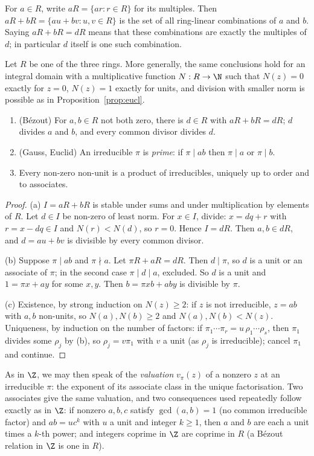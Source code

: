 For $a\in R$, write $aR=\{ar:r\in R\}$ for its multiples. Then
$aR+bR=\{au+bv:u,v\in R\}$ is the set of all ring-linear combinations of $a$ and $b$. Saying $aR+bR=dR$ means that these combinations are exactly the multiples of $d$; in particular $d$ itself is one such combination.

\begin{theorem}\label{thm:ufd}
Let $R$ be one of the three rings. More generally, the same conclusions
hold for an integral domain with a multiplicative function $N:R\to\N$
such that $N(z)=0$ exactly for $z=0$, $N(z)=1$ exactly for units,
and division with smaller norm is possible as in
Proposition~\ref{prop:eucl}.
\begin{enumerate}[label=(\alph*)]
\item (B\'ezout) For $a,b\in R$ not both zero, there is $d\in R$ with $aR+bR=dR$; $d$ divides $a$ and $b$, and every common divisor divides $d$.
\item (Gauss, Euclid) An irreducible $\pi$ is \emph{prime}: if $\pi\mid ab$ then $\pi\mid a$ or $\pi\mid b$.
\item Every non-zero non-unit is a product of irreducibles, uniquely up to order and to associates.
\end{enumerate}
\end{theorem}
\begin{proof}
(a) $I=aR+bR$ is stable under sums and under multiplication by elements of $R$. Let $d\in I$ be non-zero of least norm. For $x\in I$, divide: $x=dq+r$ with $r=x-dq\in I$ and $N(r)<N(d)$, so $r=0$. Hence $I=dR$. Then $a,b\in dR$, and $d=au+bv$ is divisible by every common divisor.

(b) Suppose $\pi\mid ab$ and $\pi\nmid a$. Let $\pi R+aR=dR$. Then $d\mid\pi$, so $d$ is a unit or an associate of $\pi$; in the second case $\pi\mid d\mid a$, excluded. So $d$ is a unit and $1=\pi x+ay$ for some $x,y$. Then $b=\pi xb+aby$ is divisible by $\pi$.

(c) Existence, by strong induction on $N(z)\ge2$: if $z$ is not irreducible, $z=ab$ with $a,b$ non-units, so $N(a),N(b)\ge2$ and $N(a),N(b)<N(z)$. Uniqueness, by induction on the number of factors: if $\pi_1\cdots\pi_r=u\,\rho_1\cdots\rho_s$, then $\pi_1$ divides some $\rho_j$ by (b), so $\rho_j=v\pi_1$ with $v$ a unit (as $\rho_j$ is irreducible); cancel $\pi_1$ and continue.
\end{proof}

As in $\Z$, we may then speak of the \emph{valuation} $v_\pi(z)$ of a nonzero $z$ at an irreducible $\pi$: the exponent of its associate class in the unique factorisation. Two associates give the same valuation, and two consequences used repeatedly follow exactly as in $\Z$: if nonzero $a,b,c$ satisfy $\gcd(a,b)=1$ (no common irreducible factor) and $ab=uc^k$ with $u$ a unit and integer $k\ge1$, then $a$ and $b$ are each a unit times a $k$-th power; and integers coprime in $\Z$ are coprime in $R$ (a B\'ezout relation in $\Z$ is one in $R$).

